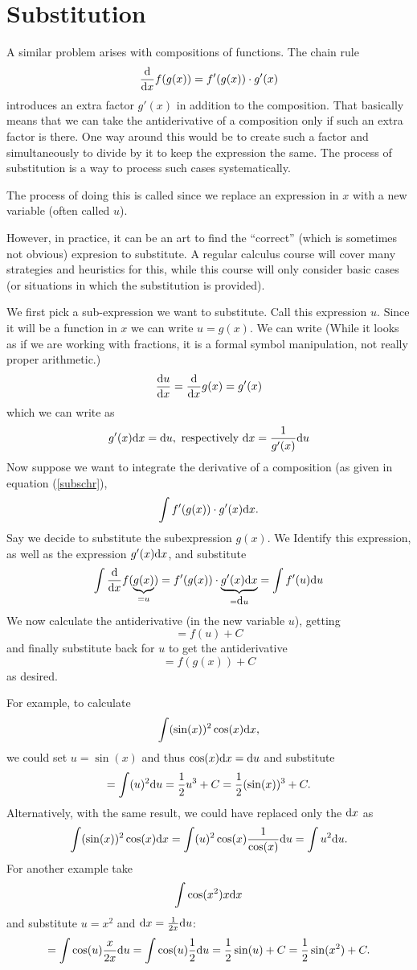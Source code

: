 \section{Substitution}

A similar problem arises with compositions of functions. The chain rule
\begin{equation}
\frac{\mbox{d}}{\mbox{d}x} f(g(x))=f'(g(x))\cdot g'(x)
\label{subschr}
\end{equation}
introduces an extra factor $g'(x)$ in addition to the composition. That
basically means that we can take the antiderivative of a composition only if
such an extra factor is there.  One way around this would be to create such
a factor and simultaneously to divide by it to keep the expression the same.
The process of substitution is a way to process such cases systematically.

The process of doing this is called  since we replace
an expression in $x$ with a new variable (often called $u$).

However, in practice, it can be an art to
find the ``correct'' (which is sometimes not obvious) expresion to substitute. A
regular calculus course will cover many strategies and heuristics for this,
while this course will only consider basic cases (or situations in which the
substitution is provided).

We first pick a sub-expression we want to substitute. Call this expression
$u$. Since it will be a function in $x$ we can write $u=g(x)$. We can write
(While it looks as if we are working with fractions, it is a formal symbol
manipulation, not really proper arithmetic.)
\[
\frac{{\mbox{d}}u}{{\mbox{d}}x}=\frac{\mbox{d}}{\mbox{d}x} g(x)=g'(x)
\]
which we can write as
\[
g'(x){\mbox{d}}x={\mbox{d}}u,\mbox{\ respectively\ } {\mbox{d}}x=\frac{1}{g'(x)}{\mbox{d}}u
\]
Now suppose we want to integrate the derivative of a composition (as given
in equation (\ref{subschr}),
\[
\int f'(g(x))\cdot g'(x){\mbox{d}}x.
\]
Say we decide to substitute the subexpression $g(x)$. We Identify this
expression, as well as the expression $g'(x){\mbox{d}}x$, and substitute
\[
\int \frac{\mbox{d}}{\mbox{d}x} f(\underbrace{g(x)}_{=u})=f'(g(x))\cdot
\underbrace{g'(x){\mbox{d}}x}_{={\mbox{d}}u}=\int f'(u){\mbox{d}}u
\]
We now calculate the antiderivative (in the new variable $u$), getting
\[
=f(u)+C
\]
and finally substitute back for $u$ to get the antiderivative
\[
=f(g(x))+C
\]
as desired.

For example, to calculate
\[
\int (\sin(x))^2\cos(x){\mbox{d}}x,
\]
we could set $u=\sin(x)$ and thus $\cos(x){\mbox{d}}x={\mbox{d}}u$ and substitute
\[
=\int (u)^2{\mbox{d}}u=\frac12 u^3+C=\frac12 (\sin(x))^3+C.
\]
Alternatively, with the same result, we could have replaced only the ${\mbox{d}}x$ as
\[
\int (\sin(x))^2\cos(x){\mbox{d}}x=\int (u)^2\cos(x)\frac{1}{\cos(x)}{\mbox{d}}u=\int
u^2{\mbox{d}}u.
\]
For another example take
\[
\int \cos(x^2)x{\mbox{d}}x
\]
and substitute $u=x^2$ and ${\mbox{d}}x=\frac{1}{2x}{\mbox{d}}u$:
\[
=\int \cos(u)\frac{x}{2x}{\mbox{d}}u
=\int \cos(u)\frac{1}{2}{\mbox{d}}u=\frac12\sin(u)+C=\frac12\sin(x^2)+C.
\]
\smallskip

